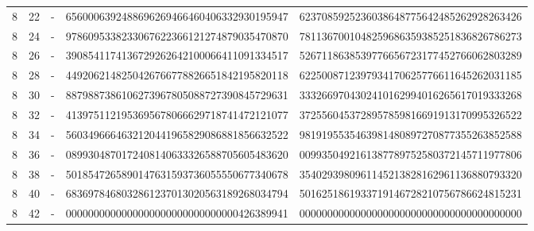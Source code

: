 \begin{longtable}{rrrll}
8 & 22 & - & 6560006392488696269466460406332930195947 & 6237085925236038648775642485262928263426 \\
8 & 24 & - & 9786095338233067622366121274879035470870 & 7811367001048259686359385251836826786273 \\
8 & 26 & - & 3908541174136729262642100066411091334517 & 5267118638539776656723177452766062803289 \\
8 & 28 & - & 4492062148250426766778826651842195820118 & 6225008712397934170625776611645262031185 \\
8 & 30 & - & 8879887386106273967805088727390845729631 & 3332669704302410162994016265617019333268 \\
8 & 32 & - & 4139751121953695678066629718741472121077 & 3725560453728957859816691913170995326522 \\
8 & 34 & - & 5603496664632120441965829086881856632522 & 9819195535463981480897270877355263852588 \\
8 & 36 & - & 0899304870172408140633326588705605483620 & 0099350492161387789752580372145711977806 \\
8 & 38 & - & 5018547265890147631593736055550677340678 & 3540293980961145213828162961136880793320 \\
8 & 40 & - & 6836978468032861237013020563189268034794 & 5016251861933719146728210756786624815231 \\
8 & 42 & - & 0000000000000000000000000000000426389941 & 0000000000000000000000000000000000000000 \\
\end{longtable}
\endgroup
